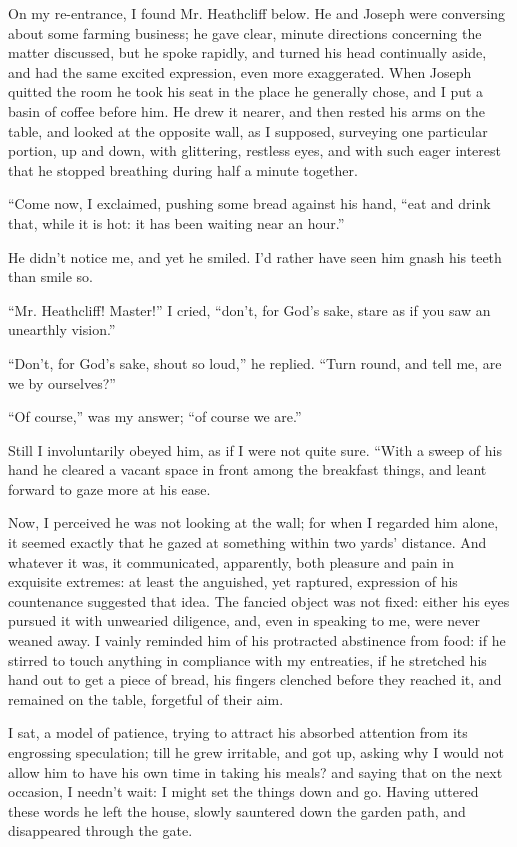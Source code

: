 \par On my re-entrance, I found Mr. Heathcliff below. He and Joseph were conversing about some farming business; he gave clear, minute directions concerning the matter discussed, but he spoke rapidly, and turned his head continually aside, and had the same excited expression, even more exaggerated. When Joseph quitted the room he took his seat in the place he generally chose, and I put a basin of coffee before him. He drew it nearer, and then rested his arms on the table, and looked at the opposite wall, as I supposed, surveying one particular portion, up and down, with glittering, restless eyes, and with such eager interest that he stopped breathing during half a minute together.
\par “Come now, I exclaimed, pushing some bread against his hand, “eat and drink that, while it is hot: it has been waiting near an hour.”
\par He didn't notice me, and yet he smiled. I'd rather have seen him gnash his teeth than smile so.
\par “Mr. Heathcliff! Master!” I cried, “don't, for God's sake, stare as if you saw an unearthly vision.”
\par “Don't, for God's sake, shout so loud,” he replied. “Turn round, and tell me, are we by ourselves?”
\par “Of course,” was my answer; “of course we are.”
\par Still I involuntarily obeyed him, as if I were not quite sure. “With a sweep of his hand he cleared a vacant space in front among the breakfast things, and leant forward to gaze more at his ease.
\par Now, I perceived he was not looking at the wall; for when I regarded him alone, it seemed exactly that he gazed at something within two yards' distance. And whatever it was, it communicated, apparently, both pleasure and pain in exquisite extremes: at least the anguished, yet raptured, expression of his countenance suggested that idea. The fancied object was not fixed: either his eyes pursued it with unwearied diligence, and, even in speaking to me, were never weaned away. I vainly reminded him of his protracted abstinence from food: if he stirred to touch anything in compliance with my entreaties, if he stretched his hand out to get a piece of bread, his fingers clenched before they reached it, and remained on the table, forgetful of their aim.
\par I sat, a model of patience, trying to attract his absorbed attention from its engrossing speculation; till he grew irritable, and got up, asking why I would not allow him to have his own time in taking his meals? and saying that on the next occasion, I needn't wait: I might set the things down and go. Having uttered these words he left the house, slowly sauntered down the garden path, and disappeared through the gate.
